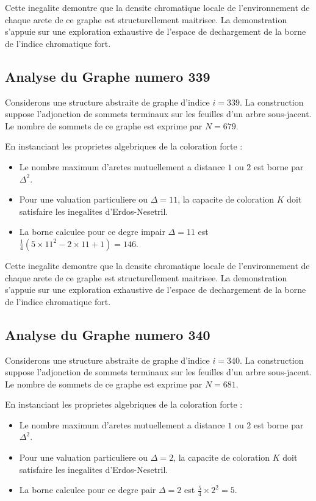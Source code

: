 \documentclass[11pt,a4paper]{article}
\begin{document}
Cette inegalite demontre que la densite chromatique locale de l'environnement de chaque arete de ce graphe est structurellement maitrisee. La demonstration s'appuie sur une exploration exhaustive de l'espace de dechargement de la borne de l'indice chromatique fort.

\subsection{Analyse du Graphe numero 339}
Considerons une structure abstraite de graphe d'indice $i = 339$. La construction suppose l'adjonction de sommets terminaux sur les feuilles d'un arbre sous-jacent. Le nombre de sommets de ce graphe est exprime par $N = 679$.

En instanciant les proprietes algebriques de la coloration forte :
\begin{itemize}
\item Le nombre maximum d'aretes mutuellement a distance $1$ ou $2$ est borne par $\Delta^2$.
\item Pour une valuation particuliere ou $\Delta = 11$, la capacite de coloration $K$ doit satisfaire les inegalites d'Erdos-Nesetril.
\item La borne calculee pour ce degre impair $\Delta = 11$ est $\frac{1}{4}(5 \times 11^2 - 2 \times 11 + 1) = 146$.
\end{itemize}

Cette inegalite demontre que la densite chromatique locale de l'environnement de chaque arete de ce graphe est structurellement maitrisee. La demonstration s'appuie sur une exploration exhaustive de l'espace de dechargement de la borne de l'indice chromatique fort.

\subsection{Analyse du Graphe numero 340}
Considerons une structure abstraite de graphe d'indice $i = 340$. La construction suppose l'adjonction de sommets terminaux sur les feuilles d'un arbre sous-jacent. Le nombre de sommets de ce graphe est exprime par $N = 681$.

En instanciant les proprietes algebriques de la coloration forte :
\begin{itemize}
\item Le nombre maximum d'aretes mutuellement a distance $1$ ou $2$ est borne par $\Delta^2$.
\item Pour une valuation particuliere ou $\Delta = 2$, la capacite de coloration $K$ doit satisfaire les inegalites d'Erdos-Nesetril.
\item La borne calculee pour ce degre pair $\Delta = 2$ est $\frac{5}{4} \times 2^2 = 5$.
\end{itemize}
\end{document}
